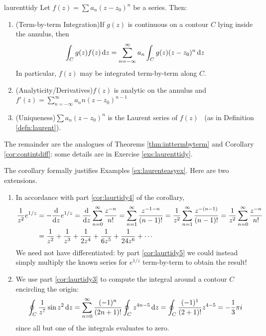 \begin{cor}{}{laurenttidy}
	Let $f(z)=\sum a_n(z-z_0)^n$ be a series. Then:
	\begin{enumerate}
  	\item\label{cor:laurtidy3} (Term-by-term Integration)\quad If $g(z)$ is continuous on a contour $C$ lying inside the annulus, then
  	\[
  		\int_C g(z)f(z)\,{\mathrm{d} z}=\sum_{n=-\infty}^\infty a_n\int_Cg(z)(z-z_0)^n\,{\mathrm{d} z}
  	\]
  	In particular, $f(z)$ may be integrated term-by-term along $C$.
 
 		\item\label{cor:laurtidy4} (Analyticity/Derivatives)\quad $f(z)$ is analytic on the annulus and $f'(z)=\sum\limits_{n=-\infty}^\infty a_nn(z-z_0)^{n-1}$
  	
  	\item\label{cor:laurtidy5} (Uniqueness)\quad $\sum a_n(z-z_0)^n$ is the Laurent series of $f(z)$ \ (as in Definition \ref{defn:laurent}).
	\end{enumerate}
\end{cor}

 The remainder are the analogues of Theorems \ref{thm:inttermbyterm} and Corollary \ref{cor:contintdiff}: some details are in Exercise \ref{exs:laurenttidy}.


\begin{examples}{}{}
	The corollary formally justifies Examples \ref{ex:laurenteasyex}. Here are two extensions.
	\begin{enumerate}
	  \item In accordance with part \ref*{cor:laurtidy4} of the corollary,
		\begin{align*}
			\frac 1{z^2}e^{1/z}
			&=-\frac{\mathrm{d} }{\mathrm{d} z}e^{1/z}=\frac{\mathrm{d} }{\mathrm{d} z}\sum_{n=0}^\infty\frac{z^{-n}}{n!} 
			=\sum_{n=1}^\infty\frac{z^{-1-n}}{(n-1)!} 
			=\frac 1{z^2}\sum_{n=1}^\infty\frac{z^{-(n-1)}}{(n-1)!} 
			=\frac 1{z^2}\sum_{n=0}^\infty\frac{z^{-n}}{n!}\\
			&=\frac 1{z^2}+\frac 1{z^3}+\frac 1{2z^4}+\frac 1{6z^5}+\frac 1{24z^6}+\cdots
		\end{align*}
		We need not have differentiated: by part \ref*{cor:laurtidy5} we could instead simply multiply the known series for $e^{1/z}$ term-by-term to obtain the result!
		\item We use part \ref*{cor:laurtidy3} to compute the integral around a contour $C$ encircling the origin:
		\[
			\oint_C\frac 1{z^7}\sin z^2\,{\mathrm{d} z} =\sum_{n=0}^\infty\frac{(-1)^n}{(2n+1)!}\oint_Cz^{4n-5}\,{\mathrm{d} z} =\oint_C\frac{(-1)^1}{(2+1)!}z^{4-5} =-\frac 13\pi i
		\]
		since all but one of the integrals evaluates to zero.
	\end{enumerate}
\end{examples}

